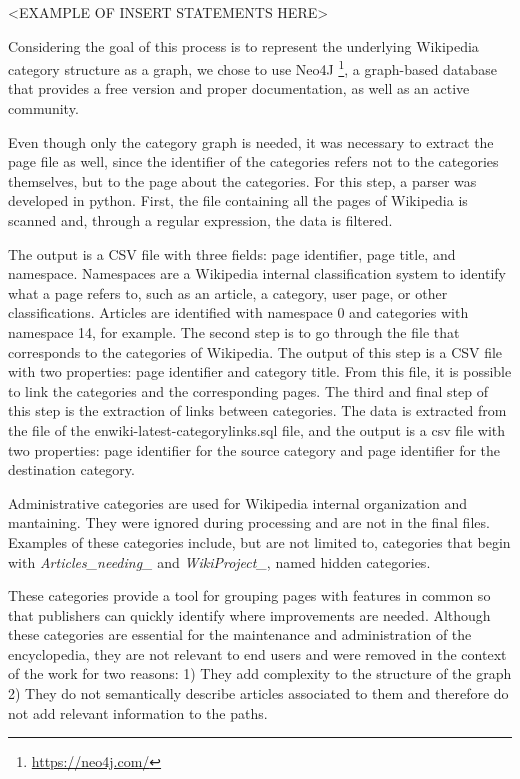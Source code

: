 <EXAMPLE OF INSERT STATEMENTS HERE>

Considering the goal of this process is to represent the underlying Wikipedia category structure as a graph, we chose to use Neo4J \footnote {\url{https://neo4j.com/}}, a graph-based database that provides a free version and proper documentation, as well as an active community. 

Even though only the category graph is needed, it was necessary to extract the page file as well, since the identifier of the categories refers not to the categories themselves, but to the page about the categories. For this step, a parser was developed in python. First, the file containing all the pages of Wikipedia is scanned and, through a regular expression, the data is filtered.

The output is a CSV file with three fields: page identifier, page title, and namespace. Namespaces are a Wikipedia internal classification system to identify what a page refers to, such as an article, a category, user page, or other classifications. Articles are identified with namespace 0 and categories with namespace 14, for example.
The second step is to go through the file that corresponds to the categories of Wikipedia. The output of this step is a CSV file with two properties: page identifier and category title. From this file, it is possible to link the categories and the corresponding pages. The third and final step of this step is the extraction of links between categories. The data is extracted from the file of the enwiki-latest-categorylinks.sql file, and the output is a csv file with two properties: page identifier for the source category and page identifier for the destination category.

Administrative categories are used for Wikipedia internal organization and mantaining. They were ignored during processing and are not in the final files. Examples of these categories include, but are not limited to, categories that begin with \textit{Articles\_needing\_} and \textit{WikiProject\_}, named hidden categories.


These categories provide a tool for grouping pages with features in common so that publishers can quickly identify where improvements are needed. Although these categories are essential for the maintenance and administration of the encyclopedia, they are not relevant to end users and were removed in the context of the work for two reasons: 1) They add complexity to the structure of the graph 2) They do not semantically describe articles associated to them and therefore do not add relevant information to the paths.


